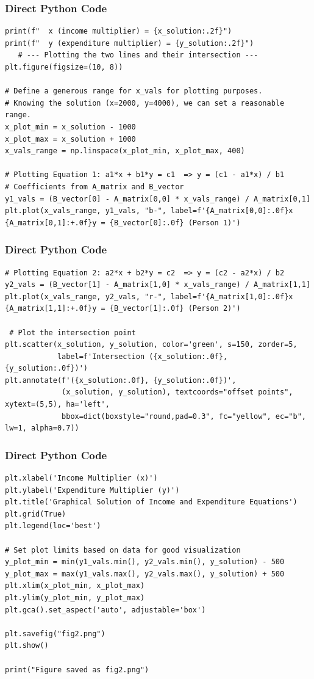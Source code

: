 \documentclass{beamer}
\begin{document}
\begin{frame}[fragile]
\frametitle{Direct Python Code }
\begin{lstlisting}
print(f"  x (income multiplier) = {x_solution:.2f}")
print(f"  y (expenditure multiplier) = {y_solution:.2f}")
   # --- Plotting the two lines and their intersection ---
plt.figure(figsize=(10, 8))

# Define a generous range for x_vals for plotting purposes.
# Knowing the solution (x=2000, y=4000), we can set a reasonable range.
x_plot_min = x_solution - 1000
x_plot_max = x_solution + 1000
x_vals_range = np.linspace(x_plot_min, x_plot_max, 400)

# Plotting Equation 1: a1*x + b1*y = c1  => y = (c1 - a1*x) / b1
# Coefficients from A_matrix and B_vector
y1_vals = (B_vector[0] - A_matrix[0,0] * x_vals_range) / A_matrix[0,1]
plt.plot(x_vals_range, y1_vals, "b-", label=f'{A_matrix[0,0]:.0f}x {A_matrix[0,1]:+.0f}y = {B_vector[0]:.0f} (Person 1)')
\end{lstlisting}
\end{frame}

\begin{frame}[fragile]
\frametitle{Direct Python Code }
\begin{lstlisting}
# Plotting Equation 2: a2*x + b2*y = c2  => y = (c2 - a2*x) / b2
y2_vals = (B_vector[1] - A_matrix[1,0] * x_vals_range) / A_matrix[1,1]
plt.plot(x_vals_range, y2_vals, "r-", label=f'{A_matrix[1,0]:.0f}x {A_matrix[1,1]:+.0f}y = {B_vector[1]:.0f} (Person 2)')

 # Plot the intersection point
plt.scatter(x_solution, y_solution, color='green', s=150, zorder=5,
            label=f'Intersection ({x_solution:.0f}, {y_solution:.0f})')
plt.annotate(f'({x_solution:.0f}, {y_solution:.0f})',
             (x_solution, y_solution), textcoords="offset points", xytext=(5,5), ha='left',
             bbox=dict(boxstyle="round,pad=0.3", fc="yellow", ec="b", lw=1, alpha=0.7))
\end{lstlisting}
\end{frame}

\begin{frame}[fragile]
\frametitle{Direct Python Code }
\begin{lstlisting}
plt.xlabel('Income Multiplier (x)')
plt.ylabel('Expenditure Multiplier (y)')
plt.title('Graphical Solution of Income and Expenditure Equations')
plt.grid(True)
plt.legend(loc='best')

# Set plot limits based on data for good visualization
y_plot_min = min(y1_vals.min(), y2_vals.min(), y_solution) - 500
y_plot_max = max(y1_vals.max(), y2_vals.max(), y_solution) + 500
plt.xlim(x_plot_min, x_plot_max)
plt.ylim(y_plot_min, y_plot_max)
plt.gca().set_aspect('auto', adjustable='box')

plt.savefig("fig2.png")
plt.show()

print("Figure saved as fig2.png")
\end{lstlisting}
\end{frame}
\end{document}
